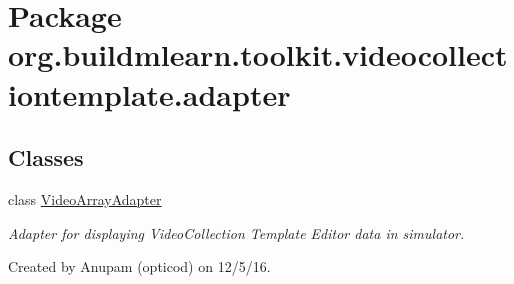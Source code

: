 \hypertarget{namespaceorg_1_1buildmlearn_1_1toolkit_1_1videocollectiontemplate_1_1adapter}{}\section{Package org.\+buildmlearn.\+toolkit.\+videocollectiontemplate.\+adapter}
\label{namespaceorg_1_1buildmlearn_1_1toolkit_1_1videocollectiontemplate_1_1adapter}
\subsection*{Classes}
\begin{DoxyCompactItemize}
\item 
class \hyperlink{classorg_1_1buildmlearn_1_1toolkit_1_1videocollectiontemplate_1_1adapter_1_1VideoArrayAdapter}{Video\+Array\+Adapter}
\begin{DoxyCompactList}\small\item\em Adapter for displaying Video\+Collection Template Editor data in simulator. 

Created by Anupam (opticod) on 12/5/16. \end{DoxyCompactList}\end{DoxyCompactItemize}
